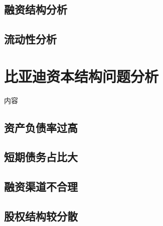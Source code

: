 \subsection{融资结构分析}


\subsection{流动性分析}


\section{比亚迪资本结构问题分析}

内容

\subsection{资产负债率过高}

\subsection{短期债务占比大}

\subsection{融资渠道不合理}

\subsection{股权结构较分散}


